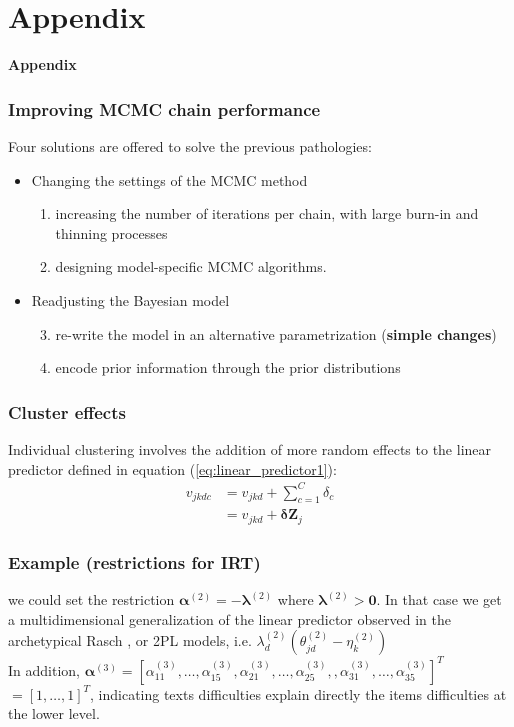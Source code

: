 \documentclass[arial,12pt,xcolor=dvipsnames]{beamer}
\begin{document}
\section*{Appendix}
%
\begin{frame}
	\textbf{Appendix}
\end{frame}
%
\begin{frame}
	\frametitle{Improving MCMC chain performance}
	Four solutions are offered to solve the previous pathologies:
	\begin{itemize}
		\item Changing the settings of the MCMC method
		\begin{enumerate}
			\item increasing the number of iterations per chain, with large burn-in and thinning processes
			\item designing model-specific MCMC algorithms.
		\end{enumerate}
		\item Readjusting the Bayesian model
		\begin{enumerate}
			\setcounter{enumi}{2}
			\item re-write the model in an alternative parametrization (\textbf{simple changes})
			\item encode prior information through the prior distributions
		\end{enumerate}
	\end{itemize}
\end{frame}
%
\begin{frame}
	\frametitle{Cluster effects}
	Individual clustering involves the addition of more random effects to the linear predictor defined in equation (\ref{eq:linear_predictor1}):
	\begin{equation} \label{eq:linear_predictor4}
		\begin{split}
			v_{jkdc} &= v_{jkd} + \sum_{c=1}^{C} \delta_{c}  \\
			&= v_{jkd} + \pmb{\delta} \mathbf{Z}_{j}
		\end{split}
	\end{equation}
\end{frame}
%
\begin{frame}
	\frametitle{Example (restrictions for IRT)}
	we could set the restriction $\pmb{\alpha}^{(2)} = -\pmb{\lambda}^{(2)}$ where $\pmb{\lambda}^{(2)} > \mathbf{0}$. In that case we get a multidimensional generalization of the linear predictor observed in the archetypical Rasch \cite{Rasch_1980}, or 2PL \cite{Lord_et_al_2008} models, i.e. $ \lambda^{(2)}_{d} (\theta^{(2)}_{jd} - \eta^{(2)}_{k} )$ \\
	\vspace{0.3cm} In addition, $\pmb{\alpha}^{(3)} = [ \alpha_{11}^{(3)}, \dots, \alpha_{15}^{(3)}, \alpha_{21}^{(3)}, \dots, \alpha_{25}^{(3)}, , \alpha_{31}^{(3)}, \dots, \alpha_{35}^{(3)} ]^{T}$ $= [1,\dots,1]^{T}$, indicating texts difficulties explain directly the items difficulties at the lower level.
\end{frame}
\end{document}
